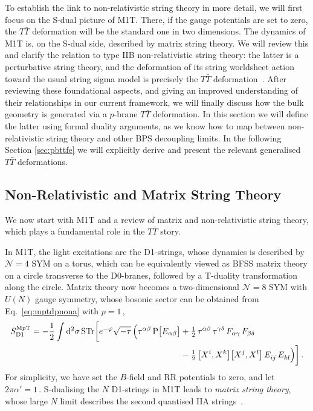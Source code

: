 \documentclass[11pt]{article}
\newcommand{\be}{\begin{equation}}
\newcommand{\ee}{\end{equation}}
\newcommand{\CN}{\mathcal{N}}
\renewcommand{\emph}[1]{\textit{#1}}
\newcommand{\wa}{\alpha}
\newcommand{\wb}{\beta}
\newcommand{\wc}{\gamma}
\newcommand{\wvd}{\delta}
\newcommand{\dd}{\mathrm{d}}
\begin{document}
To establish the link to non-relativistic string theory in more detail, we will first focus on the S-dual picture of M1T. 
There, if the gauge potentials are set to zero, the $T\bar{T}$ deformation will be the standard 
one in two dimensions. The dynamics of M1T is, on the S-dual side, described by matrix string theory.
We will review this and clarify the relation to type IIB non-relativistic string theory: the latter is a perturbative string theory, and the deformation of its string worldsheet action toward the usual string sigma model is precisely the $T\bar{T}$ deformation~\cite{Blair:2020ops}. After reviewing these foundational aspects, and giving an improved understanding of their relationships in our current framework, we will finally discuss how the bulk geometry is generated via a $p$-brane $T\bar{T}$ deformation.
In this section we will define the latter using formal duality arguments, as we know how to map between non-relativistic string theory and other BPS decoupling limits.
In the following Section \ref{sec:pbttfe} we will explicitly derive and present the relevant generalised $T \bar T$ deformations.


\subsection{Non-Relativistic and Matrix String Theory}
\label{sec:matrixstringtheory}

We now start with M1T and a review of matrix and non-relativistic string theory, which plays a fundamental role in the $T\bar{T}$ story. 

In M1T, the light excitations are the D1-strings, whose dynamics is described by $\CN = 4$ SYM on a torus, which can be equivalently viewed as BFSS matrix theory on a circle transverse to the D0-branes, followed by a T-duality transformation along the circle. Matrix theory now becomes a two-dimensional $\CN = 8$ SYM with $U(N)$ gauge symmetry, whose bosonic sector can be obtained from Eq.~\eqref{eq:mptdpnona} with $p = 1$\,,
%
\be \label{eq:mptdpnonat}
\begin{split} 
S^\text{M$p$T}_{\text{D}1} = - \frac{1}{2} \int \dd^2 \sigma \, \text{STr} \biggl[
  e^{-\varphi} \sqrt{- \tau} \, \Bigl( 
   \tau^{\wa\wb} \, {\text{P}} \bigl[ E_{\wa\wb} \bigr]
  & + \tfrac{1}{2} \, \tau^{\wa\wb} \, \tau^{\wc\wvd} \, F_{\wa\wc} \, F_{\wb\wvd} 
   \\ & - \tfrac{1}{2} \, \bigl[ X^i, X^k \bigl] \bigl[ X^j, X^l \bigr] \, E^{}_{ij} \, E^{}_{kl}
  \Bigr)
 \biggr]\,. 
\end{split}
\ee
%
For simplicity, we have set the $B$-field and RR potentials to zero, and let $2\pi\alpha' = 1$\,. S-dualising the $N$ D1-strings in M1T leads to \emph{matrix string theory}, whose large $N$ limit describes the second quantised IIA strings~\cite{Motl:1997th, Dijkgraaf:1997vv}.
\end{document}
